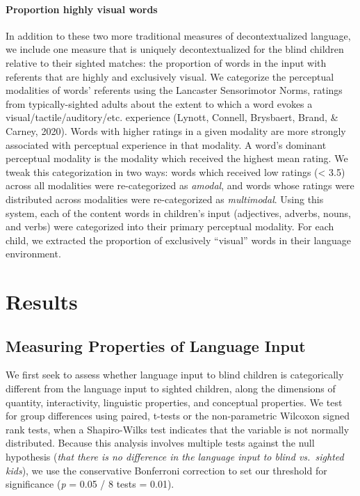 \documentclass[
  man,floatsintext]{apa6}
\let\oldparagraph\paragraph
\renewcommand{\paragraph}[1]{\oldparagraph{#1}\mbox{}}
\begin{document}
\hypertarget{proportion-highly-visual-words}{%
\paragraph{Proportion highly visual words}\label{proportion-highly-visual-words}}

In addition to these two more traditional measures of decontextualized language, we include one measure that is uniquely decontextualized for the blind children relative to their sighted matches: the proportion of words in the input with referents that are highly and exclusively visual. We categorize the perceptual modalities of words' referents using the Lancaster Sensorimotor Norms, ratings from typically-sighted adults about the extent to which a word evokes a visual/tactile/auditory/etc. experience (Lynott, Connell, Brysbaert, Brand, \& Carney, 2020). Words with higher ratings in a given modality are more strongly associated with perceptual experience in that modality. A word's dominant perceptual modality is the modality which received the highest mean rating. We tweak this categorization in two ways: words which received low ratings (\textless{} 3.5) across all modalities were re-categorized as \emph{amodal}, and words whose ratings were distributed across modalities were re-categorized as \emph{multimodal}. Using this system, each of the content words in children's input (adjectives, adverbs, nouns, and verbs) were categorized into their primary perceptual modality. For each child, we extracted the proportion of exclusively ``visual'' words in their language environment.

\hypertarget{results}{%
\section{Results}\label{results}}

\hypertarget{measuring-properties-of-language-input}{%
\subsection{Measuring Properties of Language Input}\label{measuring-properties-of-language-input}}

We first seek to assess whether language input to blind children is categorically different from the language input to sighted children, along the dimensions of quantity, interactivity, linguistic properties, and conceptual properties. We test for group differences using paired, t-tests or the non-parametric Wilcoxon signed rank tests, when a Shapiro-Wilks test indicates that the variable is not normally distributed. Because this analysis involves multiple tests against the null hypothesis (\emph{that there is no difference in the language input to blind vs.~sighted kids}), we use the conservative Bonferroni correction to set our threshold for significance (\emph{p} = 0.05 / 8 tests = 0.01).
\end{document}
